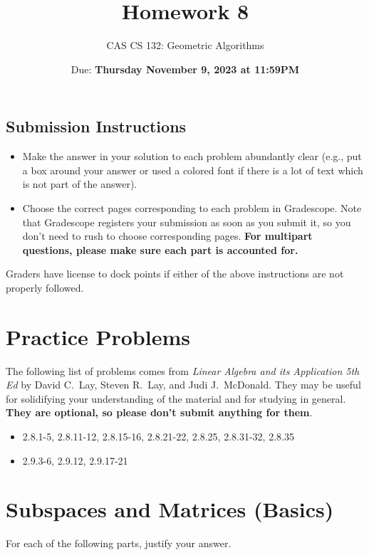 \documentclass{article}
\title{
  Homework 8
}
\author{CAS CS 132: Geometric Algorithms}
\date{Due: \textbf{Thursday November 9, 2023 at 11:59PM}}
\theoremstyle{remark}
\begin{document}
\maketitle

\subsection*{Submission Instructions}
\begin{itemize}
\item Make the answer in your solution to each problem abundantly clear (e.g., put a box around your answer or used a colored font if there is a lot of text which is not part of the answer).
\item Choose the correct pages corresponding to each problem in Gradescope. Note that Gradescope registers your submission as soon as you submit it, so you don't need to rush to choose corresponding pages.
  \textbf{For multipart questions, please make sure each part is accounted for.}
\end{itemize}
Graders have license to dock points if either of the above instructions are not properly followed.


\section*{Practice Problems}

The following list of problems comes from \textit{Linear Algebra and its Application 5th Ed} by David C.\ Lay, Steven R.\ Lay, and Judi J.\ McDonald.
They may be useful for solidifying your understanding of the material and for studying in general.
\textbf{They are optional, so please don't submit anything for them}.

\begin{itemize}
\item 2.8.1-5, 2.8.11-12, 2.8.15-16, 2.8.21-22, 2.8.25, 2.8.31-32, 2.8.35
\item 2.9.3-6, 2.9.12, 2.9.17-21
\end{itemize}

\pagebreak
\section{Subspaces and Matrices (Basics)}

For each of the following parts, justify your answer.
\end{document}
